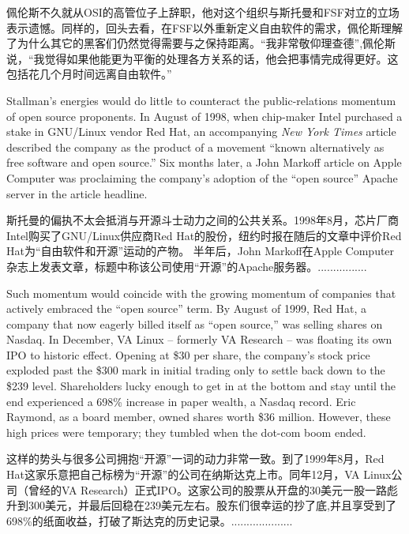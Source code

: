 \ifdefined\chs
佩伦斯不久就从OSI的高管位子上辞职，他对这个组织与斯托曼和FSF对立的立场表示遗憾。同样的，回头去看，在FSF以外重新定义自由软件的需求，佩伦斯理解了为什么其它的黑客们仍然觉得需要与之保持距离。“我非常敬仰理查德”,佩伦斯说，“我觉得如果他能更为平衡的处理各方关系的话，他会把事情完成得更好。这包括花几个月时间远离自由软件。”
\fi

\ifdefined\eng
Stallman's energies would do little to counteract the public-relations momentum of open source proponents. In August of 1998, when chip-maker Intel purchased a stake in GNU/Linux vendor Red Hat, an accompanying \textit{New York Times} article described the company as the product of a movement ``known alternatively as free software and open source.'' Six months later, a John Markoff article on Apple Computer was proclaiming the company's adoption of the ``open source'' Apache server in the article headline.
\fi

\ifdefined\chs
斯托曼的偏执不太会抵消与开源斗士动力之间的公共关系。1998年8月，芯片厂商Intel购买了GNU/Linux供应商Red Hat的股份，纽约时报在随后的文章中评价Red Hat为“自由软件和开源”运动的产物。 半年后，John Markoff在Apple Computer杂志上发表文章，标题中称该公司使用“开源”的Apache服务器。................
\fi

\ifdefined\eng
Such momentum would coincide with the growing momentum of companies that actively embraced the ``open source'' term. By August of 1999, Red Hat, a company that now eagerly billed itself as ``open source,'' was selling shares on Nasdaq. In December, VA Linux -- formerly VA Research -- was floating its own IPO to historic effect. Opening at \$30 per share, the company's stock price exploded past the \$300 mark in initial trading only to settle back down to the \$239 level. Shareholders lucky enough to get in at the bottom and stay until the end experienced a 698\% increase in paper wealth, a Nasdaq record.  Eric Raymond, as a board member, owned shares worth \$36 million.  However, these high prices were temporary; they tumbled when the dot-com boom ended.
\fi

\ifdefined\chs
这样的势头与很多公司拥抱“开源”一词的动力非常一致。到了1999年8月，Red Hat这家乐意把自己标榜为“开源”的公司在纳斯达克上市。同年12月，VA Linux公司（曾经的VA Research）正式IPO。这家公司的股票从开盘的30美元一股一路彪升到300美元，并最后回稳在239美元左右。股东们很幸运的抄了底,并且享受到了698\%的纸面收益，打破了斯达克的历史记录。....................
\fi

